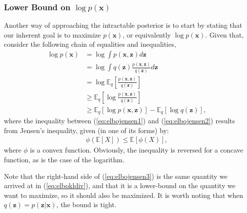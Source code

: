 \subsubsection{Lower Bound on $\log p(\bm{x})$}
\label{subsubsection:elbo}

Another way of approaching the intractable posterior is to start by stating
that our inherent goal is to maximize $p(\bm{x})$, or equivalently $\log p(\bm{x})$. Given
that, consider the following chain of equalities and inequalities,
\begin{align}
    \log p(\bm{x}) &= \log \int p(\bm{x}, \bm{z}) d\bm{z}\\
    &= \log \int q(\bm{z}) \frac{p(\bm{x}, \bm{z})}{q(\bm{z})} d\bm{z} \\
    &= \log \mathbb{E}_q[\frac{p(\bm{x}, \bm{z})}{q(\bm{z})}] \label{eq:elbojensen1} \\
    &\geq \mathbb{E}_q[\log \frac{p(\bm{x}, \bm{z})}{q(\bm{z})}] \label{eq:elbojensen2} \\
    &\geq \mathbb{E}_q[\log p(\bm{x}, \bm{z})] - \mathbb{E}_q[\log q(\bm{z})] \label{eq:elbojensen3},
\end{align}
where the inequality between (\ref{eq:elbojensen1}) and (\ref{eq:elbojensen2})
results from Jensen's inequality, given (in one of its forms) by:
\begin{align}
    \phi(\mathbb{E}[X]) \leq \mathbb{E}[\phi(X)], \label{eq:jensen}
\end{align} where $\phi$ is a convex function. Obviously, the inequality is
reversed for a concave function, as is the case of the logarithm.

Note that the right-hand side of (\ref{eq:elbojensen3}) is the same quantity
we arrived at in (\ref{eq:elbokldiv}), and that it is a lower-bound on the
quantity we want to maximize, so it should also be maximized. It is worth noting
that when $q(\bm{z}) = p(\bm{z}|\bm{x})$, the bound is tight.
